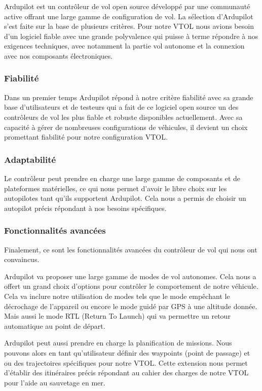\documentclass[a4paper,12pt,french]{report}
\begin{document}
Ardupilot est un contrôleur de vol open source développé par une communauté active offrant une large gamme de configuration de vol. La sélection d’Ardupilot s’est faite sur la base de plusieurs critères. Pour notre VTOL nous avions besoin d’un logiciel fiable avec une grande polyvalence qui puisse à terme répondre à nos exigences techniques, avec notamment la partie vol autonome et la connexion avec nos composants électroniques.

\subsubsection{Fiabilité}

Dans un premier temps Ardupilot répond à notre critère fiabilité avec sa grande base d’utilisateurs et de testeurs qui a fait de ce logiciel open source un des contrôleurs de vol les plus fiable et robuste disponibles actuellement.
Avec sa capacité à gérer de nombreuses configurations de véhicules, il devient un choix promettant fiabilité pour notre configuration VTOL.

\subsubsection{Adaptabilité}

Le contrôleur peut prendre en charge une large gamme de composants et de plateformes matérielles, ce qui nous permet d’avoir le libre choix sur les autopilotes tant qu’ils supportent Ardupilot. Cela nous a permis de choisir un autopilot précis répondant à nos besoins spécifiques.

\subsubsection{Fonctionnalités avancées}

Finalement, ce sont les fonctionnalités avancées du contrôleur de vol qui nous ont convaincus.\newline

Ardupilot va proposer une large gamme de modes de vol autonomes. Cela nous a offert un grand choix d’options pour contrôler le comportement de notre véhicule. Cela va inclure notre utilisation de modes tels que le mode empêchant le décrochage de l’appareil ou encore le mode guidé par GPS à une altitude donnée. Mais aussi le mode RTL (Return To Launch) qui va permettre un retour automatique au point de départ.\newline

Ardupilot peut aussi prendre en charge la planification de missions. Nous pouvons alors en tant qu’utilisateur définir des waypoints (point de passage) et ou des trajectoires spécifiques pour notre VTOL. Cette extension nous permet d’établir des itinéraires précis répondant au cahier des charges de notre VTOL pour l’aide au sauvetage en mer.\newline
\end{document}
